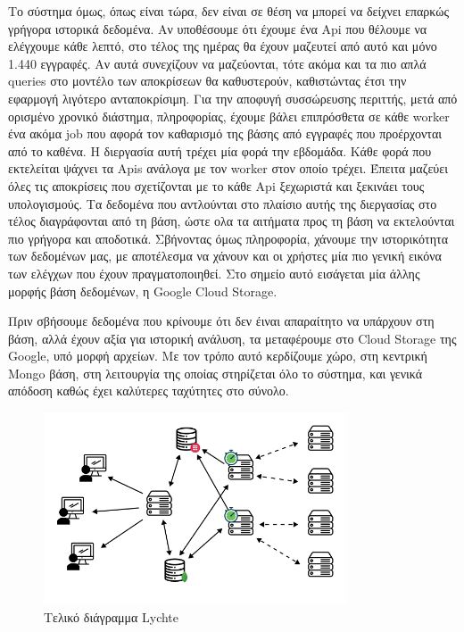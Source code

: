 Το σύστημα όμως, όπως είναι τώρα, δεν είναι σε θέση να μπορεί να δείχνει επαρκώς γρήγορα ιστορικά δεδομένα. Αν υποθέσουμε ότι έχουμε ένα Api που θέλουμε να ελέγχουμε κάθε
λεπτό, στο τέλος της ημέρας θα έχουν μαζευτεί από αυτό και μόνο 1.440 εγγραφές. Αν αυτά συνεχίζουν να μαζεύονται, τότε ακόμα και τα πιο απλά queries στο μοντέλο των αποκρίσεων θα καθυστερούν, καθιστώντας έτσι την εφαρμογή λιγότερο ανταποκρίσιμη.
Για την αποφυγή συσσώρευσης περιττής, μετά από ορισμένο χρονικό διάστημα, πληροφορίας, έχουμε βάλει επιπρόσθετα σε κάθε worker ένα ακόμα job που αφορά
τον καθαρισμό της βάσης από εγγραφές που προέρχονται από το καθένα. Η διεργασία αυτή τρέχει μία φορά την εβδομάδα. Κάθε φορά που εκτελείται ψάχνει τα Apis ανάλογα με τον worker στον οποίο τρέχει.
Έπειτα μαζεύει όλες τις αποκρίσεις που σχετίζονται με το κάθε Api ξεχωριστά και ξεκινάει τους υπολογισμούς. Τα δεδομένα που αντλούνται στο πλαίσιο αυτής της διεργασίας στο τέλος διαγράφονται από τη βάση, ώστε ολα τα αιτήματα προς τη βάση
να εκτελούνται πιο γρήγορα και αποδοτικά. Σβήνοντας όμως πληροφορία, χάνουμε την ιστορικότητα των δεδομένων μας, με αποτέλεσμα να χάνουν και οι χρήστες μία πιο γενική εικόνα των ελέγχων που έχουν πραγματοποιηθεί.
Στο σημείο αυτό εισάγεται μία άλλης μορφής βάση δεδομένων, η Google Cloud Storage.

Πριν σβήσουμε δεδομένα που κρίνουμε ότι δεν έιναι απαραίτητο να υπάρχουν στη βάση, αλλά έχουν αξία για ιστορική ανάλυση, τα μεταφέρουμε στο Cloud Storage της Google, υπό μορφή αρχείων.
Με τον τρόπο αυτό κερδίζουμε χώρο, στη κεντρική Mongo βάση, στη λειτουργία της οποίας στηρίζεται όλο το σύστημα, και γενικά απόδοση καθώς έχει καλύτερες ταχύτητες στο σύνολο.

\begin{figure}[!ht]
	\centering
	\includegraphics[width=0.8\textwidth]{./images/chapter4/lychte-third-implementation-full.png}
	\caption[Τελικό διάγραμμα Lychte]{Τελικό διάγραμμα Lychte}
	\label{fig:lychte_finalised}
\end{figure}


